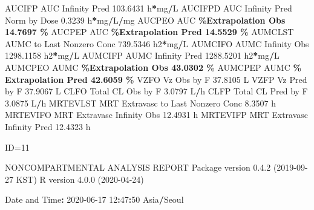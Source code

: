 \documentclass[
  12pt,
]{krantz}
\newenvironment{Shaded}{\begin{snugshade}}{\end{snugshade}}
\newcommand{\DecValTok}[1]{\textcolor[rgb]{0.00,0.00,0.81}{#1}}
\newcommand{\FloatTok}[1]{\textcolor[rgb]{0.00,0.00,0.81}{#1}}
\newcommand{\NormalTok}[1]{#1}
\newcommand{\OperatorTok}[1]{\textcolor[rgb]{0.81,0.36,0.00}{\textbf{#1}}}
\newcommand{\StringTok}[1]{\textcolor[rgb]{0.31,0.60,0.02}{#1}}
\begin{document}
\begin{Shaded}
\begin{Highlighting}[]
\NormalTok{AUCIFP     AUC Infinity Pred                             }\FloatTok{103.6431}\NormalTok{ h}\OperatorTok{*}\NormalTok{mg}\OperatorTok{/}\NormalTok{L}
\NormalTok{AUCIFPD    AUC Infinity Pred Norm by Dose                  }\FloatTok{0.3239}\NormalTok{ h}\OperatorTok{*}\NormalTok{mg}\OperatorTok{/}\NormalTok{L}\OperatorTok{/}\NormalTok{mg}
\NormalTok{AUCPEO     AUC }\OperatorTok{\%Extrapolation Obs                         14.7697 \%}
\NormalTok{AUCPEP     AUC }\OperatorTok{\%Extrapolation Pred                        14.5529 \%}
\NormalTok{AUMCLST    AUMC to Last Nonzero Conc                     }\FloatTok{739.5346}\NormalTok{ h2}\OperatorTok{*}\NormalTok{mg}\OperatorTok{/}\NormalTok{L}
\NormalTok{AUMCIFO    AUMC Infinity Obs                            }\FloatTok{1298.1158}\NormalTok{ h2}\OperatorTok{*}\NormalTok{mg}\OperatorTok{/}\NormalTok{L}
\NormalTok{AUMCIFP    AUMC Infinity Pred                           }\FloatTok{1288.5201}\NormalTok{ h2}\OperatorTok{*}\NormalTok{mg}\OperatorTok{/}\NormalTok{L}
\NormalTok{AUMCPEO    AUMC }\OperatorTok{\%Extrapolation Obs                        43.0302 \%}
\NormalTok{AUMCPEP    AUMC }\OperatorTok{\% Extrapolation Pred                      42.6059 \%}
\NormalTok{VZFO       Vz Obs by F                                    }\FloatTok{37.8105}\NormalTok{ L}
\NormalTok{VZFP       Vz Pred by F                                   }\FloatTok{37.9067}\NormalTok{ L}
\NormalTok{CLFO       Total CL Obs by F                               }\FloatTok{3.0797}\NormalTok{ L}\OperatorTok{/}\NormalTok{h}
\NormalTok{CLFP       Total CL Pred by F                              }\FloatTok{3.0875}\NormalTok{ L}\OperatorTok{/}\NormalTok{h}
\NormalTok{MRTEVLST   MRT Extravasc to Last Nonzero Conc              }\FloatTok{8.3507}\NormalTok{ h}
\NormalTok{MRTEVIFO   MRT Extravasc Infinity Obs                     }\FloatTok{12.4931}\NormalTok{ h}
\NormalTok{MRTEVIFP   MRT Extravasc Infinity Pred                    }\FloatTok{12.4323}\NormalTok{ h}





\NormalTok{ID=}\DecValTok{11}

\NormalTok{                        NONCOMPARTMENTAL ANALYSIS REPORT}
\NormalTok{                       Package version }\DecValTok{0}\NormalTok{.}\FloatTok{4.2}\NormalTok{ (}\DecValTok{2019{-}09{-}27}\NormalTok{ KST)}
\NormalTok{                          R version }\DecValTok{4}\NormalTok{.}\FloatTok{0.0}\NormalTok{ (}\DecValTok{2020{-}04{-}24}\NormalTok{)}

\NormalTok{Date and Time}\OperatorTok{:}\StringTok{ }\DecValTok{2020{-}06{-}17} \DecValTok{12}\OperatorTok{:}\DecValTok{47}\OperatorTok{:}\DecValTok{50}\NormalTok{ Asia}\OperatorTok{/}\NormalTok{Seoul}


\end{Highlighting}
\end{Shaded}
\end{document}
